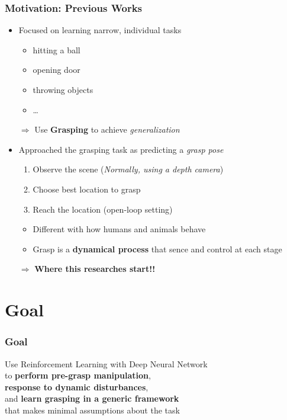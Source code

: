 \documentclass{beamer}
\newcommand{\firstSec}{Motivation}
\newcommand{\secondSec}{Goal}
\begin{document}
    \begin{frame}
      \frametitle{\firstSec : Previous Works}
      \begin{itemize}
        \item Focused on learning narrow, individual tasks
        \begin{itemize}
          \item hitting a ball
          \item opening door
          \item throwing objects
          \item \ldots
        \end{itemize}
      \end{itemize}
      \begin{itemize}
        \setlength{\itemindent}{.3in}
        \item[$\Rightarrow$] Use \textbf{Grasping} to achieve \textit{generalization}
      \end{itemize}
      \begin{itemize}
        \item Approached the grasping task as predicting a \textit{grasp pose}
        \begin{enumerate}
          \item Observe the scene (\textit{Normally, using a depth camera})
          \item Choose best location to grasp
          \item Reach the location (open-loop setting)
        \end{enumerate}
        \begin{itemize}
          \item Different with how humans and animals behave
          \item Grasp is a \textbf{dynamical process} that sence and control at each stage
        \end{itemize}
      \end{itemize}
      \begin{itemize}
        \setlength{\itemindent}{.3in}
        \item[$\Rightarrow$] \textbf{Where this researches start!!}
      \end{itemize}
    \end{frame}


  \section{\secondSec}
  \begin{frame}
    \frametitle{\secondSec}
    \centering
    \Large{Use Reinforcement Learning with Deep Neural Network\\
           to \textbf{perform pre-grasp manipulation}, \\
           \textbf{response to dynamic disturbances}, \\
           and \textbf{learn grasping in a generic framework} \\
           that makes minimal assumptions about the task}
  \end{frame}
\end{document}
